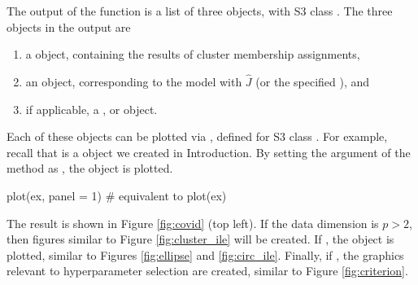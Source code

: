 The output of the function is a list of three objects, with S3 class . The three objects in the output are 
\begin{enumerate}
    \item a  object, containing the results of cluster membership assignments,
    \item an  object, corresponding to the model with $\hat{J}$ (or the specified ), and
    \item if applicable, a ,  or  object.
\end{enumerate}
Each of these objects can be plotted via , defined for S3 class . 
For example, recall that  is a  object we created in Introduction. By setting the argument  of the method  as , the  object is plotted. 

\begin{example}
plot(ex, panel = 1) # equivalent to plot(ex)
\end{example}

The result is shown in Figure \ref{fig:covid} (top left). If the data dimension is $p > 2$, then figures similar to  Figure \ref{fig:cluster_ile} will be created. If , the  object is plotted, similar to Figures \ref{fig:ellipse} and \ref{fig:circ_ile}.  Finally, if ,  the graphics relevant to hyperparameter selection are created, similar to Figure \ref{fig:criterion}.

 





